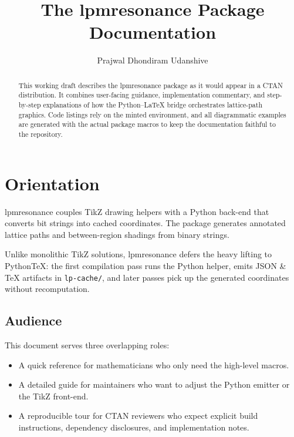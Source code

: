 \documentclass[11pt]{article}
\title{The \textsf{lpmresonance} Package\\\large Documentation}
\author{Prajwal Dhondiram Udanshive}
\date{\lpdocversion}
\begin{document}
\maketitle
\begin{abstract}
  \noindent
  This working draft describes the \textsf{lpmresonance} package as it would appear in a CTAN distribution.
  It combines user-facing guidance, implementation commentary, and step-by-step explanations of how the Python--\LaTeX{} bridge orchestrates lattice-path graphics.
  Code listings rely on the \textsf{minted} environment, and all diagrammatic examples are generated with the actual package macros to keep the documentation faithful to the repository.
\end{abstract}
\tableofcontents
\bigskip

\section{Orientation}
\textsf{lpmresonance} couples TikZ drawing helpers with a Python back-end that converts bit strings into cached coordinates. The package generates annotated lattice paths and between-region shadings from binary strings.

Unlike monolithic TikZ solutions, \textsf{lpmresonance} defers the heavy lifting to PythonTeX: the first compilation pass runs the Python helper, emits JSON \& \TeX{} artifacts in \texttt{lp-cache/}, and later passes pick up the generated coordinates without recomputation.

\subsection{Audience}
This document serves three overlapping roles:
\begin{itemize}[leftmargin=2em]
  \item A quick reference for mathematicians who only need the high-level macros.
  \item A detailed guide for maintainers who want to adjust the Python emitter or the TikZ front-end.
  \item A reproducible tour for CTAN reviewers who expect explicit build instructions, dependency disclosures, and implementation notes.
\end{itemize}
\end{document}
